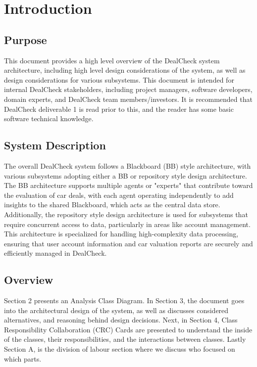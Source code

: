 \documentclass[]{article}
\begin{document}
\newpage
\section{Introduction}
\label{sec:introduction}

\subsection{Purpose}
\label{sub:purpose}
\indent\indent This document provides a high level overview of the DealCheck system architecture, including high level design considerations of the system, as well as design considerations for various subsystems. This document is intended for internal DealCheck stakeholders, including project managers, software developers, domain experts, and DealCheck team members/investors. It is recommended that DealCheck deliverable 1 is read prior to this, and the reader has some basic software technical knowledge.

\subsection{System Description}
\label{sub:system_description}
\indent\indent The overall DealCheck system follows a Blackboard (BB) style architecture, with various subsystems adopting either a BB or repository style design architecture.
The BB architecture supports multiple agents or "experts" that contribute toward the evaluation of car deals, with each agent operating independently to add insights to the shared Blackboard, which acts as the central data store.
Additionally, the repository style design architecture is used for subsystems that require concurrent access to data, particularly in areas like account management. This architecture is specialized for handling high-complexity data processing, ensuring that user account information and car valuation reports are securely and efficiently managed in DealCheck.

\subsection{Overview}
\label{sub:overview}
\indent\indent Section 2 presents an Analysis Class Diagram. In Section 3, the document goes into the architectural design of the system, as well as discusses considered alternatives, and reasoning behind design decisions. Next, in Section 4, Class Responsibility Collaboration (CRC) Cards are presented to understand the inside of the classes, their responsibilities, and the interactions between classes. Lastly Section A, is the division of labour section where we discuss who focused on which parts.
\end{document}
